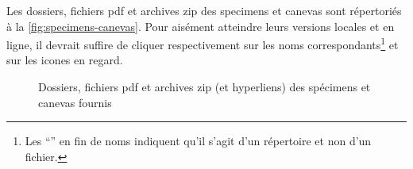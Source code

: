 Les dossiers, fichiers \acrshort{pdf} et archives \gls{zip} des specimens et
canevas sont répertoriés à la \vref{fig:specimens-canevas}. Pour aisément
atteindre leurs versions locales et en ligne, il devrait suffire de cliquer
respectivement sur les noms correspondants\footnote{Les \enquote{\directory{/}}
  en fin de noms indiquent qu'il s'agit d'un répertoire et non d'un fichier.} et
sur les icones \faExternalLink{} en regard.

\begin{figure}[ht]
  \centering
  
  \caption{Dossiers, fichiers \acrshort{pdf} et archives \gls{zip} (et
    hyperliens) des spécimens et canevas fournis}
  \label{fig:specimens-canevas}
\end{figure}


\begin{comment}
  \begin{table}[ht]
    \centering
    
    \caption{(Liens vers les )Dossiers, fichiers \acrshort{pdf} et archives \textsc{zip} des
      spécimens et canevas fournis
      avec la \yatcl{}}
    \label{tab:specimens-canevas}
  \end{table}
\end{comment}

%
\begin{comment}
  \begin{itemize}
  \item pour la distribution \TeX{} Live\versiontl, sur les systèmes :
    \begin{itemize}
    \item Linux et Mac OS X :
      \href{./.}{\directory{\unixtldirectory\tldistdirectory\jobdocdirectory/}} ;
    \item Windows :
      \href{./.}{\directory{\wintldirectory\tldistdirectory\jobdocdirectory/}} ;
    \end{itemize}
  \item pour la distribution MiK\TeX{} : \directory{\miktexdistdirectory}.
  \end{itemize}
\end{comment}

